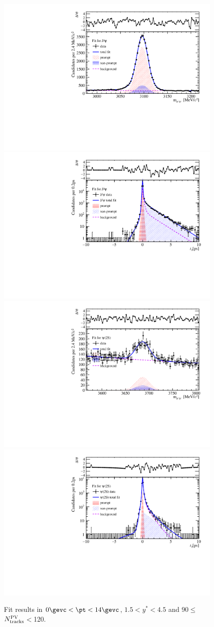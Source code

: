 \begin{figure}[H]
\begin{center}
\includegraphics[width=0.45\linewidth]{pdf/pPb/Workdir/TwoDimFit/ProjMass/Jpsi_n4y1pt1.pdf}
\includegraphics[width=0.45\linewidth]{pdf/pPb/Workdir/TwoDimFit/ProjTz/Jpsi_n4y1pt1.pdf}
\vspace*{-0.5cm}
\includegraphics[width=0.45\linewidth]{pdf/pPb/Workdir/TwoDimFit/ProjMass/Psi2S_n4y1pt1.pdf}
\includegraphics[width=0.45\linewidth]{pdf/pPb/Workdir/TwoDimFit/ProjTz/Psi2S_n4y1pt1.pdf}
\vspace*{-0.5cm}
\end{center}
\caption{Fit results in $0\gevc<\pt<14\gevc$, $1.5<y^*<4.5$ and 90$\leq$$N_{\rm tracks}^{\rm PV}$$<$120.}
\end{figure}
